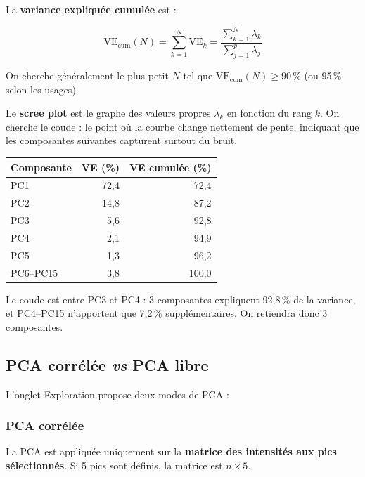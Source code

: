 \documentclass[12pt, a4paper]{article}
\begin{document}
La \textbf{variance expliquée cumulée} est :

\[
\text{VE}_{\text{cum}}(N) = \sum_{k=1}^{N} \text{VE}_k
= \frac{\displaystyle\sum_{k=1}^{N} \lambda_k}
       {\displaystyle\sum_{j=1}^{p} \lambda_j}
\]

On cherche généralement le plus petit $N$ tel que $\text{VE}_{\text{cum}}(N)
\geq 90\,\%$ (ou 95\,\% selon les usages).

\medskip

Le \textbf{scree plot} est le graphe des valeurs propres $\lambda_k$ en
fonction du rang $k$. On cherche le \og coude\fg{} : le point où la courbe
change nettement de pente, indiquant que les composantes suivantes capturent
surtout du bruit.

\begin{exemple}
\begin{center}
\begin{tabular}{lrr}
\toprule
Composante & VE (\%) & VE cumulée (\%) \\
\midrule
PC1 & 72{,}4 & 72{,}4 \\
PC2 & 14{,}8 & 87{,}2 \\
PC3 &  5{,}6 & 92{,}8 \\
PC4 &  2{,}1 & 94{,}9 \\
PC5 &  1{,}3 & 96{,}2 \\
\midrule
PC6--PC15 &  3{,}8 & 100{,}0 \\
\bottomrule
\end{tabular}
\end{center}

\medskip
Le coude est entre PC3 et PC4 : 3 composantes expliquent 92{,}8\,\% de la
variance, et PC4--PC15 n'apportent que 7{,}2\,\% supplémentaires. On retiendra
donc 3 composantes.
\end{exemple}

\subsection{PCA corrélée \textit{vs} PCA libre}

L'onglet Exploration propose deux modes de PCA :

\subsubsection{PCA corrélée}

La PCA est appliquée uniquement sur la \textbf{matrice des intensités aux pics
sélectionnés}. Si 5 pics sont définis, la matrice est $n \times 5$.
\end{document}
